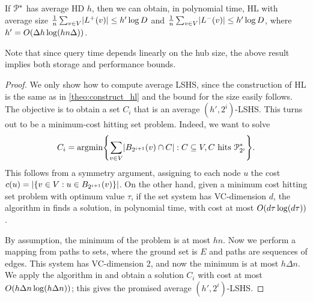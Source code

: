 \begin{theorem}\label{theo:preproc_avg}
If $\mathcal{P}^*$ has average HD $h$, then we can obtain, in polynomial time, HL with average size 
$\frac{1}{n}\sum_{v\in V} \lvert L^+(v)\rvert \leq h'\log D$ and 
$\frac{1}{n}\sum_{v\in V} \lvert L^-(v)\rvert \leq h'\log D$,
where $h'=O(\Delta h\log (hn\Delta))$.
\end{theorem}
Note that since query time depends linearly on the hub size, the above result implies both storage and performance bounds.\\
\begin{proof}
We only show how to compute average LSHS, since the construction of HL is the same as in \cref{theo:construct_hl} and the bound for the size easily follows. 
The objective is to obtain a set $C_i$ that is an average $(h',2^i)$-LSHS.
This turns out to be a minimum-cost hitting set problem.
Indeed, we want to solve
\[
C_i = \arg\!\min\crl*{\sum_{v\in V}\abs{B_{2^{i+1}}(v)\cap C}: C\subseteq V, C \text{ hits } \PS_{2^i}}.
\]
This follows from a symmetry argument, assigning to each node $u$ the cost $c(u)=\lvert\{v\in V: u\in B_{2^{i+1}}(v)\}\rvert$.
On the other hand, given a minimum cost hitting set problem with optimum value $\tau$, if the set system has VC-dimension $d$, the algorithm in \citep{vc_dim_hitting} finds a solution, in polynomial time, with cost at most $O(d\tau\log(d\tau))$.

By assumption, the minimum of the problem is at most $hn$.
Now we perform a mapping from paths to sets, where the ground set is $E$ and paths are sequences of edges.
This system has VC-dimension 2, and now the minimum is at most $h\Delta n$.
We apply the algorithm in \citep{vc_dim_hitting} and obtain a solution $C_i$ with cost at most $O(h\Delta n\log(h\Delta n))$; this gives the promised average $(h',2^i)$-LSHS.
\end{proof}
